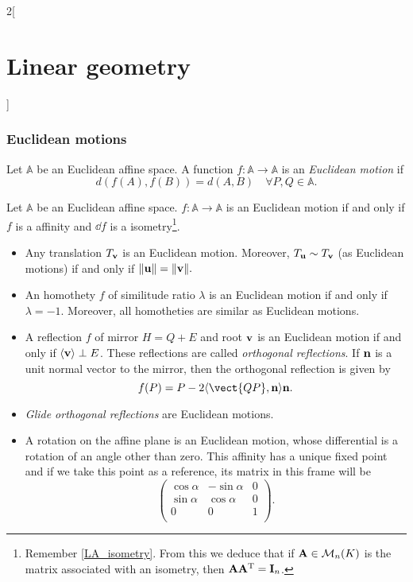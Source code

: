 \documentclass[../../../main.tex]{subfiles}
\begin{document}
\begin{multicols}{2}[\section{Linear geometry}]
    \subsubsection{Euclidean motions}
    \label{LG_euclidean_motion}
    \begin{definition}
        Let $\mathbb{A}$ be an Euclidean affine space. A function $f:\mathbb{A}\rightarrow\mathbb{A}$ is an \textit{Euclidean motion} if $$d(f(A),f(B))=d(A,B)\quad\forall P,Q\in\mathbb{A}.$$
    \end{definition}
    \begin{prop}
        Let $\mathbb{A}$ be an Euclidean affine space. $f:\mathbb{A}\rightarrow\mathbb{A}$ is an Euclidean motion if and only if $f$ is a affinity and $\dd f$ is a isometry\footnote{Remember \cref{LA_isometry}. From this we deduce that if $\boldsymbol{\mathrm{A}}\in\mathcal{M}_n(K)$ is the matrix associated with an isometry, then $\boldsymbol{\mathrm{A}}\vb{A}^{\mathrm{T}}=\boldsymbol{\mathrm{I}}_n$.}.
    \end{prop}
    \begin{prop}
        \hfill
        \begin{itemize}
            \item Any translation $T_{\boldsymbol{\mathrm{v}}}$ is an Euclidean motion. Moreover, $T_{\boldsymbol{\mathrm{u}}}\sim T_{\boldsymbol{\mathrm{v}}}$ (as Euclidean motions) if and only if $\|\boldsymbol{\mathrm{u}}\|=\|\boldsymbol{\mathrm{v}}\|.$
            \item An homothety $f$ of similitude ratio $\lambda$ is an Euclidean motion if and only if $\lambda=-1$. Moreover, all homotheties are similar as Euclidean motions.
            \item A reflection $f$ of mirror $H=Q+E$ and root $\boldsymbol{\mathrm{v}}$ is an Euclidean motion if and only if $\langle\boldsymbol{\mathrm{v}}\rangle\perp E$. These reflections are called \textit{orthogonal reflections}. If $\boldsymbol{\mathrm{n}}$ is a unit normal vector to the mirror, then the orthogonal reflection is given by $$f(P)=P-2\langle\vect{QP},\vf{n}\rangle\vf{n}.$$
            \item \textit{Glide orthogonal reflections} are Euclidean motions.
            \item A rotation on the affine plane is an Euclidean motion, whose differential is a rotation of an angle other than zero. This affinity has a unique fixed point and if we take this point as a reference, its matrix in this frame will be $$\begin{pmatrix}
                          \cos\alpha & -\sin\alpha & 0 \\
                          \sin\alpha & \cos\alpha  & 0 \\
                          0          & 0           & 1 \\
                      \end{pmatrix}.$$
        \end{itemize}
    \end{prop}

\end{multicols}
\end{document}
